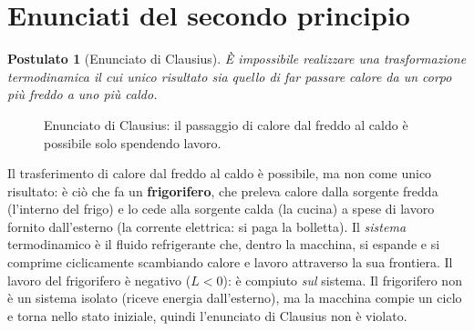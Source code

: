 \documentclass[11pt, a4paper, openright]{book}
\theoremstyle{plain}
\newtheorem{postulato}[teorema]{Postulato}
\theoremstyle{definition}
\theoremstyle{remark}
\begin{document}
\section{Enunciati del secondo principio}
\begin{postulato}[Enunciato di Clausius]
    È impossibile realizzare una trasformazione termodinamica il cui \emph{unico} risultato sia quello di far passare calore da un corpo più freddo a uno più caldo.
\end{postulato}

\begin{figure}[H]
    \centering
    \caption{Enunciato di Clausius: il passaggio di calore dal freddo al caldo è possibile solo spendendo lavoro.}
\end{figure}

Il trasferimento di calore dal freddo al caldo è possibile, ma non come unico risultato: è ciò che fa un \textbf{frigorifero}, che preleva calore dalla sorgente fredda (l'interno del frigo) e lo cede alla sorgente calda (la cucina) a spese di lavoro fornito dall'esterno (la corrente elettrica: si paga la bolletta). Il \emph{sistema} termodinamico è il fluido refrigerante che, dentro la macchina, si espande e si comprime ciclicamente scambiando calore e lavoro attraverso la sua frontiera. Il lavoro del frigorifero è negativo ($L < 0$): è compiuto \emph{sul} sistema. Il frigorifero non è un sistema isolato (riceve energia dall'esterno), ma la macchina compie un ciclo e torna nello stato iniziale, quindi l'enunciato di Clausius non è violato.
\end{document}
